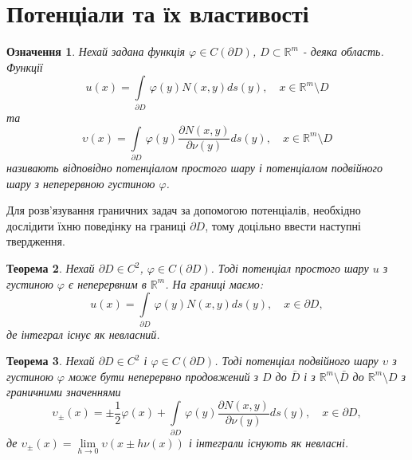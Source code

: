 \documentclass[a4 paper,12pt,ukrainian]{report}
\newtheorem{theorem}{\textbf{Теорема}}[chapter]
\newtheorem{determination}[theorem]{\textbf{Означення}}
\begin{document}


\section{Потенціали та їх властивості}
\begin{determination}\cite{Kress}
Нехай задана функція $\varphi\in C(\partial D)$, $D\subset\mathbb{R}^m$ - деяка область. Функції
\begin{equation*}
u(x) = \int\limits_{\partial{D}} \, \varphi(y)N(x,y) ds(y) , \quad x \in \mathbb{R}^m\setminus D
\end{equation*}
та
\begin{equation*}
\upsilon(x) = \int\limits_{\partial{D}} \, \varphi(y)\frac{\partial N(x,y)}{\partial\nu(y)} ds(y) , \quad x \in \mathbb{R}^m\setminus D
\end{equation*}
називають відповідно потенціалом простого шару і потенціалом подвійного шару з неперервною густиною $\varphi$.
\end{determination}
\hspace*{\parindent}Для розв'язування граничних задач за допомогою потенціалів, необхідно дослідити їхню поведінку на границі $\partial{D}$, тому доцільно ввести наступні твердження.
\begin{theorem}\cite{Kress}
Нехай $\partial{D}\in C^2$, $\varphi\in C(\partial{D})$. Тоді потенціал простого шару $u$ з густиною $\varphi$ є неперервним в $\mathbb{R}^m$. На границі маємо:
\begin{equation*}
u(x) = \int\limits_{\partial{D}} \, \varphi(y)N(x,y) ds(y) , \quad x \in \partial D,
\end{equation*}
де інтеграл існує як невласний.
\end{theorem}
\begin{theorem}\cite{Kress}
Нехай $\partial D\in C^2$ і $\varphi\in C(\partial D)$. Тоді потенціал подвійного шару $\upsilon$ з густиною $\varphi$ може бути неперервно продовжений з $D$ до $\bar{D}$ і з $\mathbb{R}^m\setminus\bar{D}$ до $\mathbb{R}^m\setminus D$ з граничними значеннями
\begin{equation*}
\upsilon_\pm(x) = \pm\frac{1}{2}\varphi(x)+\int\limits_{\partial{D}} \, \varphi(y)\frac{\partial N(x,y)}{\partial\nu(y)} ds(y) , \quad x \in \partial D,
\end{equation*}
де $\upsilon_\pm(x)=\lim\limits_{h \to 0}\upsilon(x\pm h\nu(x))$ і інтеграли існують як невласні. 
\end{theorem}
\end{document}
